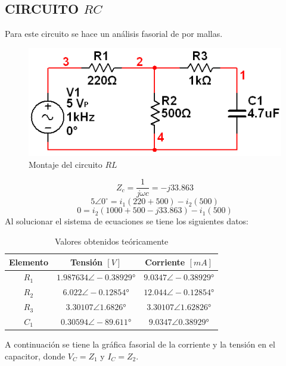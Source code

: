 \documentclass[twocolumn]{IEEEtran}
\begin{document}
\subsection{CIRCUITO $RC$}
\noindent
Para este circuito se hace un análisis fasorial de por mallas.
\begin{figure}[H]
	\centering
		\includegraphics[scale=0.5]{circ2.png}
	\caption{Montaje del circuito $RL$}
	\label{fig4}
\end{figure}
\noindent
\begin{equation}
 Z_c = \frac{1}{{j\omega c}} =  - j33.863
\label{ecu4}
\end{equation}
\begin{equation}
 5\angle 0^\circ  = {i_1}(220 + 500) - {i_2}(500)
\label{ecu5}
\end{equation}
\begin{equation}
 0 = {i_2}\left( {1000 + 500 - j33.863} \right) - {i_1}(500)
\label{ecu6}
\end{equation}
\noindent
Al solucionar el sistema de ecuaciones se tiene los siguientes datos:
\begin{table}[H]
	\centering
\begin{tabular}[c]{|c|c|c|} \hline
Elemento & Tensión $[V]$ & Corriente $[mA]$ \\ \hline
$R_1$ & $1.987634 \angle -0.38929°$ & $9.0347 \angle -0.38929°$ \\ \hline
$R_2$ & $6.022 \angle -0.12854°$ & $12.044 \angle -0.12854°$ \\ \hline
$R_3$ & $3.30107 \angle 1.6826°$ & $3.30107 \angle 1.62826°$ \\ \hline
$C_1$ & $0.30594 \angle -89.611°$ & $9.0347 \angle 0.38929°$ \\ \hline
\end{tabular}
	\caption{Valores obtenidos teóricamente}
	\label{tab2}
\end{table}
\noindent
A continuación se tiene la gráfica fasorial de la corriente y la tensión en el capacitor, donde $V_C=Z_1$ y $I_C=Z_2$.
\end{document}
